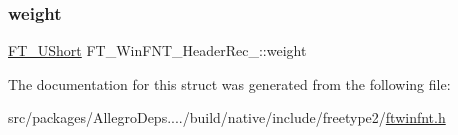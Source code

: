 \mbox{\label{struct_f_t___win_f_n_t___header_rec___aa06f2d447dc9b048ae42498d03e361db}} 
\subsubsection{\texorpdfstring{weight}{weight}}
{\footnotesize\ttfamily \hyperlink{fttypes_8h_a937f6c17cf5ffd09086d8610c37b9f58}{F\+T\+\_\+\+U\+Short} F\+T\+\_\+\+Win\+F\+N\+T\+\_\+\+Header\+Rec\+\_\+\+::weight}



The documentation for this struct was generated from the following file\+:\begin{DoxyCompactItemize}
\item 
src/packages/\+Allegro\+Deps..../build/native/include/freetype2/\hyperlink{ftwinfnt_8h}{ftwinfnt.\+h}\end{DoxyCompactItemize}
